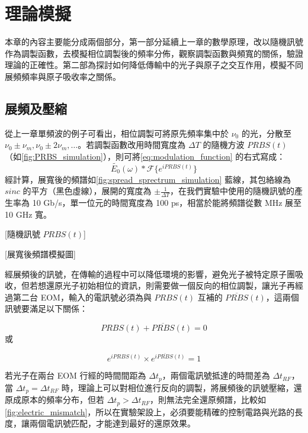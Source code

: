\documentclass[class=NCU_thesis, crop=false]{standalone}
\begin{document}
\chapter{理論模擬}
本章的內容主要能分成兩個部分，第一部分延續上一章的數學原理，改以隨機訊號作為調製函數，去模擬相位調製後的頻率分佈，觀察調製函數與頻寬的關係，驗證理論的正確性。第二部為探討如何降低傳輸中的光子與原子之交互作用，模擬不同展頻頻率與原子吸收率之關係。

\section{展頻及壓縮}
從上一章單頻波的例子可看出，相位調製可將原先頻率集中於 $\nu_{0}$ 的光，分散至 $\nu_{0}\pm\nu_{m}, \nu_{0}\pm2\nu_{m},\dots$。若調製函數改用時間寬度為 $\Delta T$ 的隨機方波 $PRBS(t)$ （如\cref{fig:PRBS_simulation}），則可將\cref{eq:modulation_function} 的右式寫成：
\begin{equation}
    \tilde{E_{0}}(\omega)*\mathscr{F}\{{e^{i PRBS(t)}}\}
\end{equation}
經計算，展寬後的頻譜如\cref{fig:spread_sprectrum_simulation} 藍線，其包絡線為 $sinc$ 的平方（黑色虛線），展開的寬度為 $\pm\frac{1}{\Delta T}$，在我們實驗中使用的隨機訊號的產生率為 10 Gb/s，單一位元的時間寬度為 100 ps，相當於能將頻譜從數 MHz 展至 10 GHz 寬。

[隨機訊號 $PRBS(t)$]

[展寬後頻譜模擬圖]

經展頻後的訊號，在傳輸的過程中可以降低環境的影響，避免光子被特定原子團吸收，但若想還原光子初始相位的資訊，則需要做一個反向的相位調製，讓光子再經過第二台 EOM，輸入的電訊號必須為與 $PRBS(t)$ 互補的 $\overline{PRBS}(t)$，這兩個訊號要滿足以下關係：

\begin{equation}
    \label{eq:prbs_condition}
    PRBS(t)+\overline{PRBS}(t)=0
\end{equation}
或

\begin{equation}
    e^{i PRBS(t)}\times e^{i \overline{PRBS}(t)}=1
\end{equation}

若光子在兩台 EOM 行經的時間間距為 $\Delta t_{p}$，兩個電訊號抵達的時間差為 $\Delta t_{RF}$，當 $\Delta t_{p}=\Delta t_{RF}$ 時，理論上可以對相位進行反向的調製，將展頻後的訊號壓縮，還原成原本的頻率分布，但若 $\Delta t_{p}>\Delta t_{RF}$，則無法完全還原頻譜，比較如\cref{fig:electric_mismatch}，所以在實驗架設上，必須要能精確的控制電路與光路的長度，讓兩個電訊號匹配，才能達到最好的還原效果。
\end{document}
